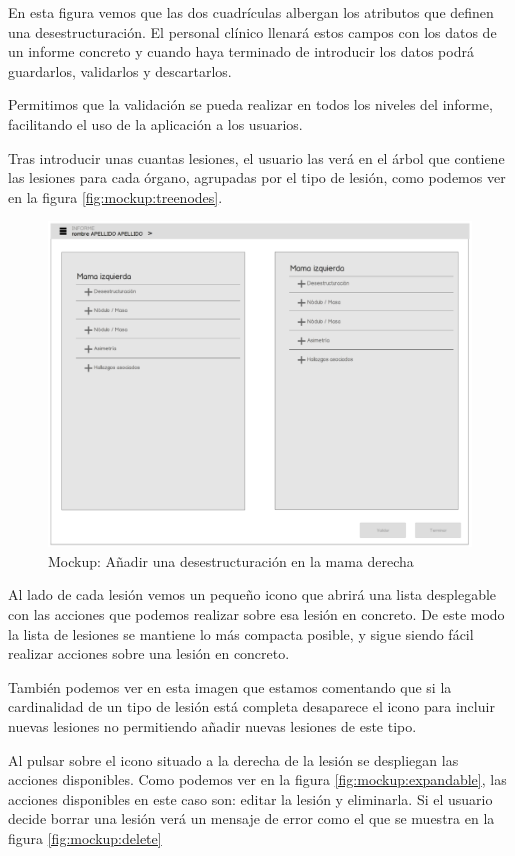 En esta figura vemos que las dos cuadrículas albergan los atributos que definen una desestructuración. El personal clínico llenará estos campos con los datos de un informe concreto y cuando haya terminado de introducir los datos podrá guardarlos, validarlos y descartarlos.\par
Permitimos que la validación se pueda realizar en todos los niveles del informe, facilitando el uso de la aplicación a los usuarios.\medskip\par
Tras introducir unas cuantas lesiones, el usuario las verá en el árbol que contiene las lesiones para cada órgano, agrupadas por el tipo de lesión, como podemos ver en la figura \ref{fig:mockup:treenodes}.\medskip\par

\begin{figure}[ht]
\centering
\includegraphics[page=11,scale=0.4]{./imgs/mockup/mockup.pdf}
\caption{Mockup: Añadir una desestructuración en la mama derecha}
\label{fig:mockup:add}
\end{figure}

Al lado de cada lesión vemos un pequeño icono que abrirá una lista desplegable con las acciones que podemos realizar sobre esa lesión en concreto. De este modo la lista de lesiones se mantiene lo más compacta posible, y sigue siendo fácil realizar acciones sobre una lesión en concreto.\par
También podemos ver en esta imagen que estamos comentando que si la cardinalidad de un tipo de lesión está completa desaparece el icono para incluir nuevas lesiones no permitiendo añadir nuevas lesiones de este tipo.\par
Al pulsar sobre el icono situado a la derecha de la lesión se despliegan las acciones disponibles. Como podemos ver en la figura \ref{fig:mockup:expandable}, las acciones disponibles en este caso son: editar la lesión y eliminarla. Si el usuario decide borrar una lesión verá un mensaje de error como el que se muestra en la figura \ref{fig:mockup:delete}\medskip\par

